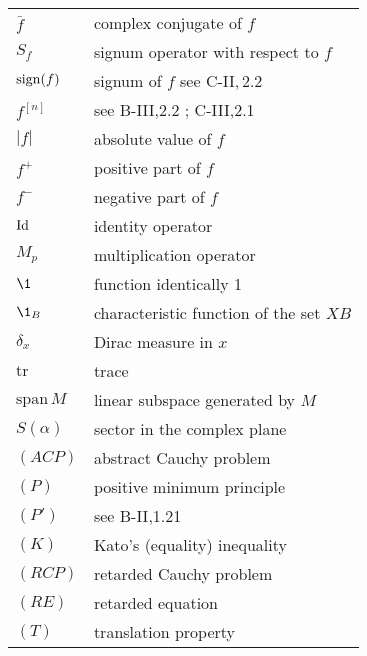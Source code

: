 \begin{longtable}{p{}p{}}
$\bar{f}$ & complex conjugate of $f$ \\ %
$S_{f}$ & signum operator with respect to $f$ \\ %
$\operatorname{sign}(f)$ & signum of $f$ see C-II,\,2.2 \\ %
$f^{[n]}$ & see B-III,2.2 ; C-III,2.1 \\ %
$|f|$ & absolute value of $f$ \\ %
$f^{+}$ & positive part of $f$ \\ %
$f^{-}$ & negative part of $f$ \\ %
%
%
%
$\operatorname{Id}$ & identity operator \\ %
$M_{p}$ & multiplication operator \\ %
$\1$ & function identically 1 \\ %
$\1_{B}$ & characteristic function of the set $XB$ \\ %
$\delta_{x}$ & Dirac measure in $x$ \\ %
$\text{tr}$ & trace \\ %
$\text{span}\,M$ & linear subspace generated by $M$ \\ %
$S(\alpha)$ & sector in the complex plane \\ %
$(ACP)$ & abstract Cauchy problem \\ %
$(P)$ & positive minimum principle \\ %
$(P')$ & see B-II,1.21 \\ %
$(K)$ & Kato's (equality) inequality \\ %
$(RCP)$ & retarded Cauchy problem \\ %
$(RE)$ & retarded equation \\ %
$(T)$ & translation property \\ %

\end{longtable}

%